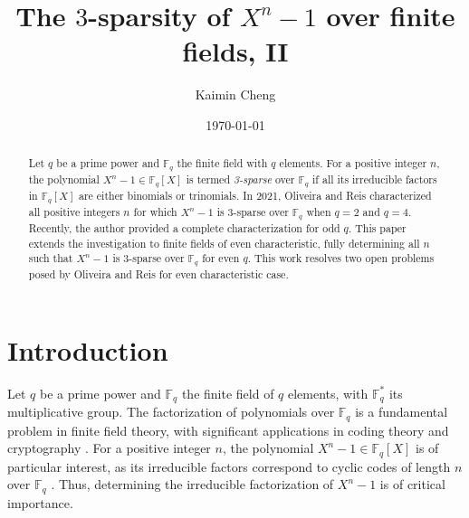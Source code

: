 \documentclass[10pt,reqno]{amsart}
\theoremstyle{definition}
\theoremstyle{remark}
\numberwithin{equation}{section}
\begin{document}
\title[The $3$-sparsity of $X^n-1$]
{The $3$-sparsity of $X^n-1$ over finite fields, II}%
\author{Kaimin Cheng}
\address{School of Mathematics and Information, China West Normal University, Nanchong, 637002, P. R. China}
%
\date{\today}%
\begin{abstract}
Let $q$ be a prime power and $\mathbb{F}_q$ the finite field with $q$ elements. For a positive integer $n$, the polynomial $X^n - 1 \in \mathbb{F}_q[X]$ is termed \emph{3-sparse} over $\mathbb{F}_q$ if all its irreducible factors in $\mathbb{F}_q[X]$ are either binomials or trinomials. In 2021, Oliveira and Reis characterized all positive integers $n$ for which $X^n - 1$ is 3-sparse over $\mathbb{F}_q$ when $q = 2$ and $q = 4$. Recently, the author provided a complete characterization for odd $q$. This paper extends the investigation to finite fields of even characteristic, fully determining all $n$ such that $X^n - 1$ is 3-sparse over $\mathbb{F}_q$ for even $q$. This work resolves two open problems posed by Oliveira and Reis for even characteristic case.
\end{abstract}

\maketitle

\section{Introduction}
Let $q$ be a prime power and $\mathbb{F}_q$ the finite field of $q$ elements, with $\mathbb{F}_q^*$ its multiplicative group. The factorization of polynomials over $\mathbb{F}_q$ is a fundamental problem in finite field theory, with significant applications in coding theory \cite{[Ber68]} and cryptography \cite{[Len91]}. For a positive integer $n$, the polynomial $X^n - 1 \in \mathbb{F}_q[X]$ is of particular interest, as its irreducible factors correspond to cyclic codes of length $n$ over $\mathbb{F}_q$ \cite{[Van98]}. Thus, determining the irreducible factorization of $X^n - 1$ is of critical importance.
\end{document}
